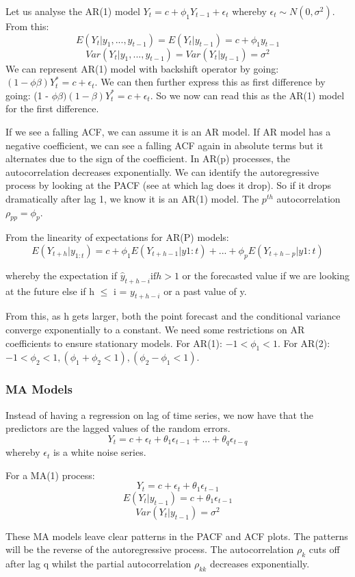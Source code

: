 \documentclass[11pt, oneside]{article}
\theoremstyle{definition}
\begin{document}
Let us analyse the AR(1) model $Y_t = c + \phi_1 Y_{t-1} + \epsilon_t$ whereby $\epsilon_t \sim N(0,\sigma^2)$. From this:
$$
E(Y_t|y_1,...,y_{t-1}) = E(Y_t|y_{t-1}) = c + \phi_1y_{t-1}
$$
$$
Var(Y_t|y_1,...,y_{t-1}) = Var(Y_t|y_{t-1}) = \sigma^2
$$
We can represent AR(1) model with backshift operator by going: $(1 - \phi \beta)Y^{*}_{t} = c + \epsilon_t$. We can then further express this as first difference by going: (1 - $\phi \beta)(1-\beta)Y^{*}_{t} = c + \epsilon_t$. So we now can read this as the AR(1) model for the first difference.

If we see a falling ACF, we can assume it is an AR model. If AR model has a negative coefficient, we can see a falling ACF again in absolute terms but it alternates due to the sign of the coefficient. In AR(p) processes, the autocorrelation decreases exponentially. We can identify the autoregressive process by looking at the PACF (see at which lag does it drop). So if it drops dramatically after lag 1, we know it is an AR(1) model. The $p^{th}$ autocorrelation $\rho_{pp} = \phi_p$.

From the linearity of expectations for AR(P) models:
$$
E(Y_{t+h}|y_{1:t}) = c + \phi_1E(Y_{t+h-1}|y{1:t}) + ... + \phi_pE(Y_{t+h-p}|y{1:t})
$$

whereby the expectation if $\hat{y}_{t+h-i} \text{if} h>1$ or the forecasted value if we are looking at the future else if h $\leq$ i = $y_{t+h-i}$ or a past value of y.

From this, as h gets larger, both the point forecast and the conditional variance converge exponentially to a constant. We need some restrictions on AR coefficients to ensure stationary models. For AR(1): $-1 < \phi_1 < 1$. For AR(2): $-1 < \phi_2 < 1, (\phi_1+\phi_2 <1), (\phi_2 - \phi_1 < 1)$.

\subsubsection{MA Models}
Instead of having a regression on lag of time series, we now have that the predictors are the lagged values of the random errors.
$$
Y_t = c + \epsilon_t + \theta_1\epsilon_{t-1} + ... + \theta_q\epsilon_{t-q}
$$
whereby $\epsilon_t$ is a white noise series.

For a MA(1) process:
$$
Y_t = c + \epsilon_t + \theta_1\epsilon_{t-1}
$$
$$
E(Y_t|y_{t-1}) = c + \theta_1\epsilon_{t-1}
$$
$$
Var(Y_t|y_{t-1}) = \sigma^2
$$

These MA models leave clear patterns in the PACF and ACF plots. The patterns will be the reverse of the autoregressive process. The autocorrelation $\rho_k$ cuts off after lag q whilst the partial autocorrelation $\rho_{kk}$ decreases exponentially.
\end{document}

